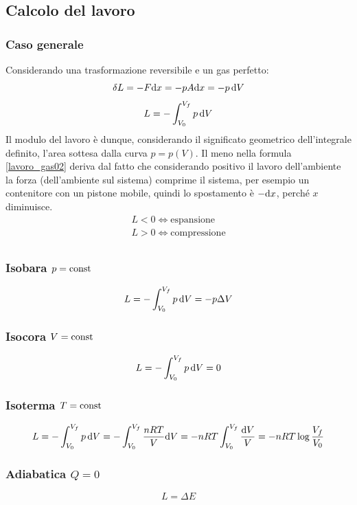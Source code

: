 \subsection{Calcolo del lavoro}
\subsubsection{Caso generale}
Considerando una trasformazione reversibile e un gas perfetto:
$$\delta L=-F\mathrm{d} x=-pA\mathrm{d} x=-p\,\mathrm{d} V$$
\begin{equation}
L=-\int_{V_0}^{V_f} p\,\mathrm{d} V
\label{lavoro_gas02}
\end{equation}
Il modulo del lavoro è dunque, considerando il significato geometrico dell'integrale definito, l'area sottesa dalla curva $p=p(V)$. Il meno nella formula \eqref{lavoro_gas02} deriva dal fatto che considerando positivo il lavoro dell'ambiente la forza (dell'ambiente sul sistema) comprime il sistema, per esempio un contenitore con un pistone mobile, quindi lo spostamento è $-\mathrm{d} x$, perché $x$ diminuisce.
$$\begin{array}{l}
L<0 \Leftrightarrow \text{espansione}\\
L>0 \Leftrightarrow \text{compressione}\\
\end{array}$$

\subsubsection{Isobara $p=\text{const}$}
\begin{equation}
L=-\int_{V_0}^{V_f} p\,\mathrm{d} V=-p\Delta V
\end{equation}
\subsubsection{Isocora $V=\text{const}$}
\begin{equation}
L=-\int_{V_0}^{V_f} p\,\mathrm{d} V=0
\end{equation}
\subsubsection{Isoterma $T=\text{const}$}
\begin{equation}
L=-\int_{V_0}^{V_f} p\,\mathrm{d} V=-\int_{V_0}^{V_f} \frac{nRT}{V}\mathrm{d} V=-nRT\int_{V_0}^{V_f} \frac{\mathrm{d} V}{V}=-nRT\log\frac{V_f}{V_0}
\end{equation}
\subsubsection{Adiabatica $Q=0$}
\begin{equation}
L=\Delta E
\end{equation}
